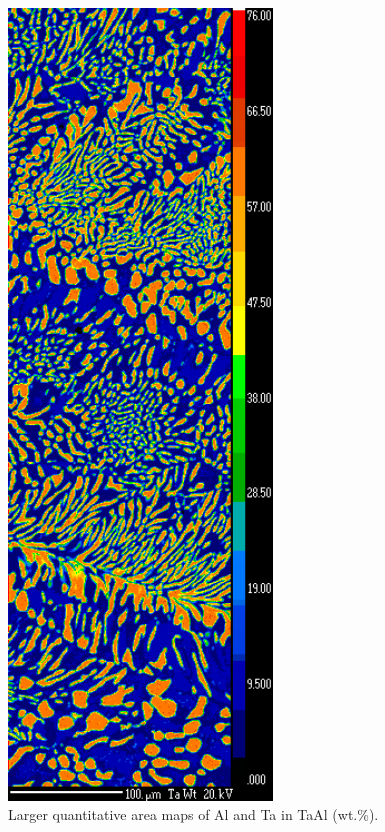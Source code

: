 \begin{figure}[htbp]
\begin{center}
\includegraphics[width=7cm]{TaWt}
\caption{Larger quantitative area maps of Al and Ta in TaAl (wt.\%).}\label{fig:area_map_AlTawt}
\end{center}
\end{figure}
%
%
